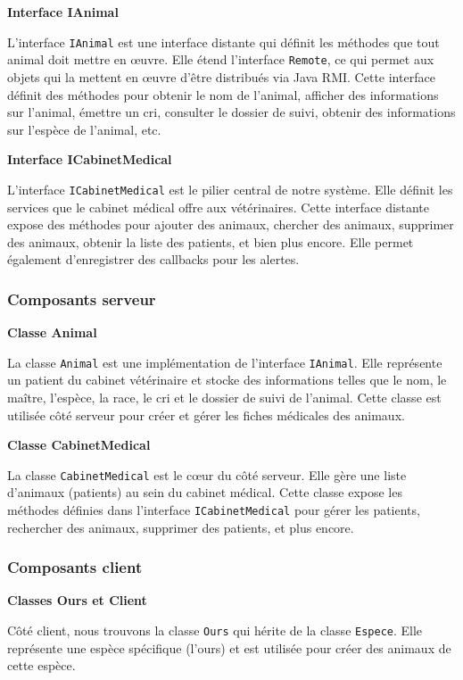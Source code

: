 \documentclass{article} %
\begin{document}
\textbf{Interface IAnimal}
\bigskip


L'interface \texttt{IAnimal} est une interface distante qui définit les méthodes que tout animal doit mettre en œuvre. Elle étend l'interface \texttt{Remote}, ce qui permet aux objets qui la mettent en œuvre d'être distribués via Java RMI. Cette interface définit des méthodes pour obtenir le nom de l'animal, afficher des informations sur l'animal, émettre un cri, consulter le dossier de suivi, obtenir des informations sur l'espèce de l'animal, etc.

\textbf{Interface ICabinetMedical}
\bigskip


L'interface \texttt{ICabinetMedical} est le pilier central de notre système. Elle définit les services que le cabinet médical offre aux vétérinaires. Cette interface distante expose des méthodes pour ajouter des animaux, chercher des animaux, supprimer des animaux, obtenir la liste des patients, et bien plus encore. Elle permet également d'enregistrer des callbacks pour les alertes.

\subsubsection{Composants serveur}

\textbf{Classe Animal}
\bigskip


La classe \texttt{Animal} est une implémentation de l'interface \texttt{IAnimal}. Elle représente un patient du cabinet vétérinaire et stocke des informations telles que le nom, le maître, l'espèce, la race, le cri et le dossier de suivi de l'animal. Cette classe est utilisée côté serveur pour créer et gérer les fiches médicales des animaux.

\textbf{Classe CabinetMedical}
\bigskip


La classe \texttt{CabinetMedical} est le cœur du côté serveur. Elle gère une liste d'animaux (patients) au sein du cabinet médical. Cette classe expose les méthodes définies dans l'interface \texttt{ICabinetMedical} pour gérer les patients, rechercher des animaux, supprimer des patients, et plus encore.

\subsubsection{Composants client}

\textbf{Classes Ours et Client}
\bigskip


Côté client, nous trouvons la classe \texttt{Ours} qui hérite de la classe \texttt{Espece}. Elle représente une espèce spécifique (l'ours) et est utilisée pour créer des animaux de cette espèce.
\end{document}
